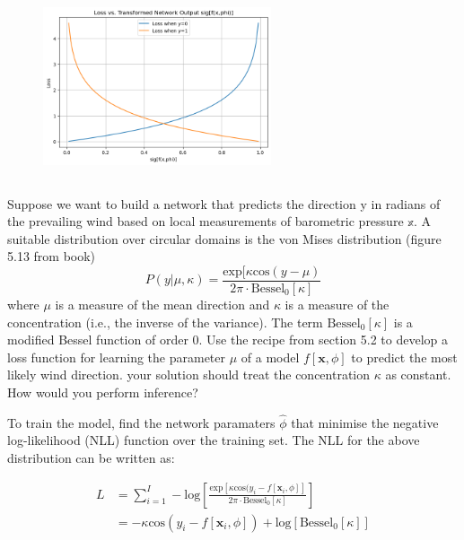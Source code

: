 \documentclass[12pt]{report}
\begin{document}
\begin{figure}[h]
    \centering
    \includegraphics[width=0.6\textwidth]{q5_2.png}
    \label{fig:q5_2}
\end{figure}

\subsection{}
\begin{mdframed}
    Suppose we want to build a network that predicts the direction y in radians of the prevailing wind based on local measurements of barometric pressure $\mathbb{x}$. A suitable distribution over circular domains is the von Mises distribution (figure 5.13 from book)
    \begin{equation*}
        P(y|\mu,\kappa) = \frac{\text{exp}[\kappa\text{cos}(y-\mu)}{2\pi \cdot \text{Bessel}_{0}[\kappa]}
    \end{equation*}
    where $\mu$ is a measure of the mean direction and $\kappa$ is a measure of the concentration (i.e., the inverse of the variance). The term $\text{Bessel}_{0}[\kappa]$ is a modified Bessel function of order 0. Use the recipe from section 5.2 to develop a loss function for learning the parameter $\mu$ of a model $f[\mathbf{x},\phi]$ to predict the most likely wind direction. your solution should treat the concentration $\kappa$ as constant. How would you perform inference?
\end{mdframed}

To train the model, find the network paramaters $\hat{\phi}$ that minimise the negative log-likelihood (NLL) function over the training set. The NLL for the above distribution can be written as:

\begin{align*}
    L & = \sum^{I}_{i=1} - \text{log}\left[\frac{\text{exp}[\kappa\text{cos}(y_{i}-f[\mathbf{x}_{i}, \phi]]}{2\pi \cdot \text{Bessel}_{0}[\kappa]}\right] \\
      & = -\kappa\text{cos}(y_{i}-f[\mathbf{x}_{i}, \phi]) + \text{log}[\text{Bessel}_{0}[\kappa]]
\end{align*}
\end{document}
